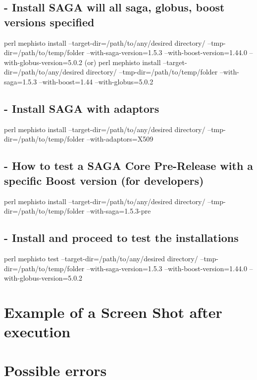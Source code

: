 \documentclass[a4paper,10pt]{article}
\begin{document}
\subsection*{- Install SAGA will all saga, globus, boost versions specified}
perl mephisto install --target-dir=/path/to/any/desired directory/ --tmp-dir=/path/to/temp/folder --with-saga-version=1.5.3 --with-boost-version=1.44.0 --with-globus-version=5.0.2
(or)
perl mephisto install --target-dir=/path/to/any/desired directory/ --tmp-dir=/path/to/temp/folder --with-saga=1.5.3 --with-boost=1.44 --with-globus=5.0.2

\subsection*{- Install SAGA with adaptors}
perl mephisto install --target-dir=/path/to/any/desired directory/ --tmp-dir=/path/to/temp/folder --with-adaptors=X509

\subsection*{- How to test a SAGA Core Pre-Release with a specific Boost version (for developers)}
perl mephisto install --target-dir=/path/to/any/desired directory/ --tmp-dir=/path/to/temp/folder --with-saga=1.5.3-pre

\subsection*{- Install and proceed to test the installations}
perl mephisto test --target-dir=/path/to/any/desired directory/ --tmp-dir=/path/to/temp/folder --with-saga-version=1.5.3 --with-boost-version=1.44.0 --with-globus-version=5.0.2

\section*{Example of a Screen Shot after execution}
\section*{Possible errors} 



% 
%  
% 
\end{document}
